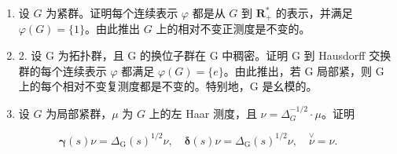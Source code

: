 \exercisesection{}

\begin{enumerate}
\def\labelenumi{\arabic{enumi})}
\item
  设 \(G\) 为紧群。证明每个连续表示 \(\varphi\) 都是从 \(G\) 到 \(\mathbf{R}_+^*\) 的表示，并满足 \(\varphi(G) = \{1\}\)。由此推出 \(G\) 上的相对不变正测度是不变的。
\item
  2. 设 G 为拓扑群，且 G 的换位子群在 G 中稠密。证明 G 到 Hausdorff 交换群的每个连续表示 \(\varphi\) 都满足 \(\varphi(G) = \{e\}\)。由此推出，若 G 局部紧，则 G 上的每个相对不变复测度都是不变的。特别地，G 是幺模的。
\item
  设 \(G\) 为局部紧群，\(\mu\) 为 \(G\) 上的左 Haar 测度，且 \(\nu = \Delta_G^{-1/2} \cdot \mu\)。证明
\end{enumerate}

\[
\boldsymbol {\gamma} (s) \nu = \Delta_ {\mathrm{G}} (s) ^ {1 / 2} \nu , \quad \boldsymbol {\delta} (s) \nu = \Delta_ {\mathrm{G}} (s) ^ {1 / 2} \nu , \quad \stackrel {\vee} {\nu} = \nu .
\]

